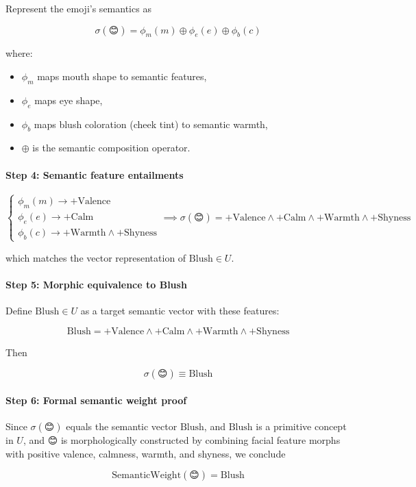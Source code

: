 \documentclass{article}
\begin{document}
Represent the emoji's semantics as

\[
\sigma(\text{😊}) = \phi_m(m) \oplus \phi_e(e) \oplus \phi_b(c)
\]

where:  
\begin{itemize}
    \item $\phi_m$ maps mouth shape to semantic features,
    \item $\phi_e$ maps eye shape,
    \item $\phi_b$ maps blush coloration (cheek tint) to semantic warmth,
    \item $\oplus$ is the semantic composition operator.
\end{itemize}

\paragraph{Step 4: Semantic feature entailments}

\[
\begin{cases}
\phi_m(m) \to +\mathrm{Valence} \\
\phi_e(e) \to +\mathrm{Calm} \\
\phi_b(c) \to +\mathrm{Warmth} \wedge +\mathrm{Shyness}
\end{cases}
\implies
\sigma(\text{😊}) = +\mathrm{Valence} \wedge +\mathrm{Calm} \wedge +\mathrm{Warmth} \wedge +\mathrm{Shyness}
\]

which matches the vector representation of $\mathrm{Blush} \in U$.

\paragraph{Step 5: Morphic equivalence to Blush}

Define $\mathrm{Blush} \in U$ as a target semantic vector with these features:

\[
\mathrm{Blush} = +\mathrm{Valence} \wedge +\mathrm{Calm} \wedge +\mathrm{Warmth} \wedge +\mathrm{Shyness}
\]

Then

\[
\sigma(\text{😊}) \equiv \mathrm{Blush}
\]

\paragraph{Step 6: Formal semantic weight proof}

Since $\sigma(\text{😊})$ equals the semantic vector $\mathrm{Blush}$, and $\mathrm{Blush}$ is a primitive concept in $U$,  
and $\text{😊}$ is morphologically constructed by combining facial feature morphs with positive valence, calmness, warmth, and shyness,  
we conclude

\[
\boxed{
\mathrm{SemanticWeight}(\text{😊}) = \mathrm{Blush}
}
\]
\end{document}
